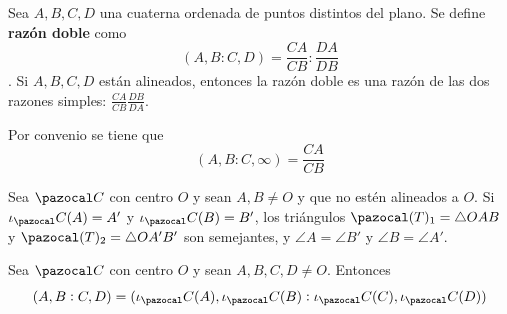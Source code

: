  Sea $A,B,C,D$ una cuaterna ordenada de puntos distintos del plano. Se define \textbf{razón doble} como 
$$(A,B:C,D) = \frac{CA}{CB}:\frac{DA}{DB}$$. 
Si $A,B,C,D$ están alineados, entonces la razón doble es una razón de las dos razones simples: $\frac{CA}{CB}\frac{DB}{DA}$.

Por convenio se tiene que 
$$(A,B:C,\infty) = \frac{CA}{CB}$$


 Sea $\C$ con centro $O$ y sean $A,B \neq O$ 
y que no estén alineados a $O$. Si $\iota_\C(A)=A'$ y $\iota_\C(B) = B'$, los triángulos $\pazocal(T)_1 = \triangle OAB$ y $\pazocal (T)_2 = \triangle OA'B'$ son semejantes, y $\angle A = \angle B'$ y $\angle B = \angle A'$.

 Sea $\C$ con centro $O$ y sean $A, B, C, D\neq O$. Entonces
$$(A,B:C,D) = (\iota_\C(A), \iota_\C(B):\iota_\C(C),\iota_\C(D))$$

